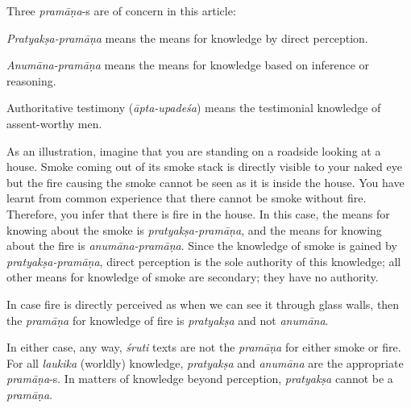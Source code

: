 Three {\sl pramāṇa}-s are of concern in this article:
\begin{myquote}
{{\sl Pratyakṣa-pramāṇa}} means the means for knowledge by direct perception. 

{{\sl Anumāna-pramāṇa}} means the means for knowledge based on inference or reasoning.  

Authoritative testimony {({\sl āpta-upadeśa})} means the testimonial knowledge of assent-worthy men.
\end{myquote}

As an illustration, imagine that you are standing on a roadside looking at a house. Smoke coming out of its smoke stack is directly visible to your naked eye but the fire causing the smoke cannot be seen as it is inside the house.  You have learnt from common experience that there cannot be smoke without fire.  Therefore, you infer that there is fire in the house.  In this case, the means for knowing about the smoke is {\sl pratyakṣa-pramāṇa}, and the means for knowing about the fire is {\sl anumāna-pramāṇa}.  Since the knowledge of smoke is gained by {\sl pratyakṣa-pramāṇa}, direct perception is the sole authority of this knowledge; all other means for knowledge of smoke are secondary; they have no authority.  

In case fire is directly perceived as when we can see it through glass walls, then the {\sl pramāṇa} for knowledge of fire is {\sl pratyakṣa} and not {\sl anumāna}.  

In either case, any way, {\sl śruti} texts are not the {\sl pramāṇa} for either smoke or fire.  For all {\sl laukika} (worldly) knowledge, {\sl pratyakṣa} and {\sl anumāna} are the appropriate {\sl pramāṇa}-s. In matters of knowledge beyond perception, {\sl pratyakṣa} cannot be a {\sl pramāṇa}.

